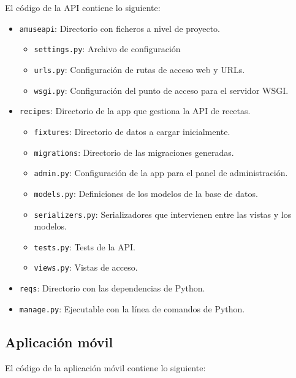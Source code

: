 El código de la API contiene lo siguiente:
\begin{itemize}
\item \texttt{amuseapi}: Directorio con ficheros a nivel de proyecto.
  \begin{itemize}
  \item \texttt{settings.py}: Archivo de configuración
  \item \texttt{urls.py}: Configuración de rutas de acceso web y URLs.
  \item \texttt{wsgi.py}: Configuración del punto de acceso para el servidor
    WSGI.
  \end{itemize}
\item \texttt{recipes}: Directorio de la app que gestiona la API de recetas.
  \begin{itemize}
  \item \texttt{fixtures}: Directorio de datos a cargar inicialmente.
  \item \texttt{migrations}: Directorio de las migraciones generadas.
  \item \texttt{admin.py}: Configuración de la app para el panel de
    administración.
  \item \texttt{models.py}: Definiciones de los modelos de la base de datos.
  \item \texttt{serializers.py}: Serializadores que intervienen entre las vistas
    y los modelos.
  \item \texttt{tests.py}: Tests de la API.
  \item \texttt{views.py}: Vistas de acceso.
  \end{itemize}
\item \texttt{reqs}: Directorio con las dependencias de Python.
\item \texttt{manage.py}: Ejecutable con la línea de comandos de Python.
\end{itemize}

\subsection{Aplicación móvil}

El código de la aplicación móvil contiene lo siguiente:

